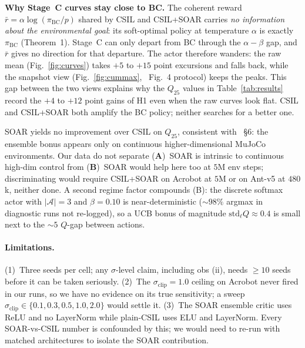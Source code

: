 \documentclass[10pt]{article}
\newcommand{\Aspace}{\mathcal{A}}
\newcommand{\bcpol}{\pi_{\mathrm{BC}}}
\newcommand{\rb}{\bar{r}}
\begin{document}
\textbf{Why Stage~C curves stay close to BC.} The coherent reward
$\rb\!=\!\alpha\log(\bcpol/p)$ shared by CSIL and CSIL+SOAR carries
\emph{no information about the environmental goal}: its soft-optimal
policy at temperature $\alpha$ is exactly $\bcpol$ (Theorem~1).
Stage~C can only depart from BC through the $\alpha\!-\!\beta$ gap,
and $\rb$ gives no direction for that departure. The actor therefore
wanders: the raw mean (Fig.~\ref{fig:curves}) takes $+5$ to $+15$
point excursions and falls back, while the snapshot view
(Fig.~\ref{fig:cummax}, \cite{watson2023csil}~Fig.~4 protocol)
keeps the peaks. This gap between the two views explains why the
$Q_{25}$ values in Table~\ref{tab:results} record the $+4$ to $+12$
point gains of H1 even when the raw curves look flat. CSIL and CSIL+SOAR
both amplify the BC policy; neither searches for a better one.

SOAR yields no improvement over CSIL on $Q_{25}$, consistent with
\cite{viel2025ilsoar}~\S6: the ensemble bonus appears only on
continuous higher-dimensional MuJoCo environments. Our data do not separate
(\textbf{A})~SOAR is intrinsic to continuous high-dim control from
(\textbf{B})~SOAR would help here too at $5$M env steps;
discriminating would require CSIL+SOAR on Acrobot at $5$M or on
Ant-v5 at $480$k, neither done. A second regime factor compounds (B):
the discrete softmax actor with $|\Aspace|\!=\!3$ and $\beta\!=\!0.10$
is near-deterministic ($\sim\!98\%$ argmax in diagnostic runs not
re-logged), so a UCB bonus of magnitude
$\mathrm{std}_\ell Q\!\approx\!0.4$ is small next to the $\sim\!5$
$Q$-gap between actions.

\paragraph{Limitations.}
(1)~Three seeds per cell; any $\sigma$-level claim, including obs (ii),
needs $\ge\!10$ seeds before it can be taken seriously. (2)~The
$\sigma_{\mathrm{clip}}\!=\!1.0$ ceiling on Acrobot never fired in
our runs, so we have no evidence on its true sensitivity; a sweep
$\sigma_{\mathrm{clip}}\!\in\!\{0.1,0.3,0.5,1.0,2.0\}$ would settle it.
(3)~The SOAR ensemble critic uses ReLU and no LayerNorm while
plain-CSIL uses ELU and LayerNorm. Every SOAR-vs-CSIL number is
confounded by this; we would need to re-run with matched architectures
to isolate the SOAR contribution.
\end{document}
